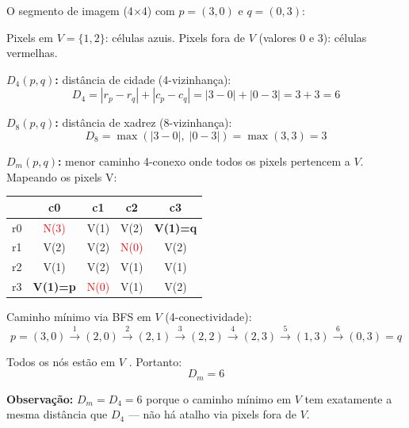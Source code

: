 \documentclass[12pt,a4paper,oneside,brazil]{abntex2}
\begin{document}
O segmento de imagem (4$\times$4) com $p = (3,0)$ e $q = (0,3)$:

\begin{center}
\end{center}

\noindent Pixels em $V=\{1,2\}$: c\'elulas azuis. Pixels fora de $V$ (valores 0 e 3): c\'elulas vermelhas.

\begin{resposta}

\textbf{$D_4(p,q)$:} dist\^ancia de cidade (4-vizinhan\c{c}a):
\[
  D_4 = |r_p - r_q| + |c_p - c_q| = |3-0| + |0-3| = 3+3 = \boxed{6}
\]

\textbf{$D_8(p,q)$:} dist\^ancia de xadrez (8-vizinhan\c{c}a):
\[
  D_8 = \max(|3-0|,\;|0-3|) = \max(3,3) = \boxed{3}
\]

\textbf{$D_m(p,q)$:} menor caminho 4-conexo onde todos os pixels pertencem
a $V$. Mapeando os pixels V:

\begin{center}
\small
\begin{tabular}{c|cccc}
 & c0 & c1 & c2 & c3 \\\hline
r0 & \textcolor{red}{N(3)} & V(1) & V(2) & \textbf{V(1)=q} \\
r1 & V(2) & V(2) & \textcolor{red}{N(0)} & V(2) \\
r2 & V(1) & V(2) & V(1) & V(1) \\
r3 & \textbf{V(1)=p} & \textcolor{red}{N(0)} & V(1) & V(2) \\
\end{tabular}
\end{center}

Caminho m\'inimo via BFS em $V$ (4-conectividade):
\[
p{=}(3,0)\xrightarrow{1}(2,0)\xrightarrow{2}(2,1)\xrightarrow{3}(2,2)
\xrightarrow{4}(2,3)\xrightarrow{5}(1,3)\xrightarrow{6}(0,3){=}q
\]

Todos os n\'os est\~ao em $V$ \checkmark. Portanto:
\[
  D_m = \boxed{6}
\]

\textbf{Observa\c{c}\~ao:} $D_m = D_4 = 6$ porque o caminho m\'inimo
em $V$ tem exatamente a mesma dist\^ancia que $D_4$ --- n\~ao h\'a
atalho via pixels fora de $V$.

\end{resposta}
\end{document}
